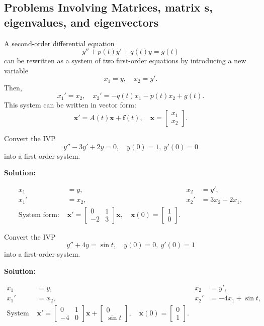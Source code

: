     \subsection{Problems Involving Matrices, matrix \ode{}s, eigenvalues, and eigenvectors}
      A second-order differential equation
      \[
      y'' + p(t) y' + q(t) y = g(t)
      \]
      can be rewritten as a system of two first-order equations by introducing a new variable
      \[
      x_1 = y, \quad x_2 = y'.
      \]
      Then,
      \[
      x_1' = x_2, \quad x_2' = -q(t) x_1 - p(t) x_2 + g(t).
      \]
      This system can be written in vector form:
      \[
      \mathbf{x}' = A(t) \mathbf{x} + \mathbf{f}(t), \quad \mathbf{x} = \begin{bmatrix} x_1 \\ x_2 \end{bmatrix}.
      \]

      \begin{example}
        Convert the IVP
        \[
        y'' - 3y' + 2y = 0, \quad y(0)=1, \ y'(0)=0
        \]
        into a first-order system.

        \textbf{Solution:}  

        \begin{align*}
          x_1 &= y, & x_2 &= y', \\
          x_1' &= x_2, & x_2' &= 3x_2 - 2x_1, \\
          \text{System form: } & \mathbf{x}' = \begin{bmatrix} 0 & 1 \\ -2 & 3 \end{bmatrix} \mathbf{x}, \quad \mathbf{x}(0) = \begin{bmatrix} 1 \\ 0 \end{bmatrix}.
        \end{align*}
      \end{example}

      \begin{example}
        Convert the IVP
        \[
        y'' + 4y = \sin t, \quad y(0)=0, \ y'(0)=1
        \]
        into a first-order system.

        \textbf{Solution:}

        \begin{align*}
          x_1 &= y, & x_2 &= y', \\
          x_1' &= x_2, & x_2' &= -4x_1 + \sin t, \\
          \text{System form: } & \mathbf{x}' = \begin{bmatrix} 0 & 1 \\ -4 & 0 \end{bmatrix} \mathbf{x} + \begin{bmatrix} 0 \\ \sin t \end{bmatrix}, \quad \mathbf{x}(0) = \begin{bmatrix} 0 \\ 1 \end{bmatrix}.
        \end{align*}
      \end{example}


